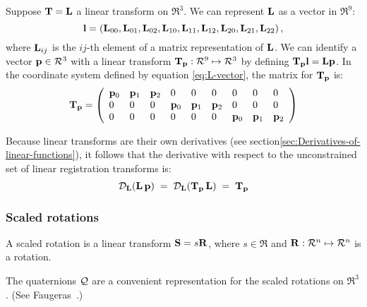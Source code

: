 Suppose ${\mathbf T} = {\mathbf L}$ a linear transform on $\Re^3$.
We can represent ${\mathbf L}$ as a vector in $\Re^9$:
\begin{equation}
\label{eq:L-vector}
{\mathbf l} = \left({\mathbf L}_{00},{\mathbf L}_{01},{\mathbf L}_{02},
       {\mathbf L}_{10},{\mathbf L}_{11},{\mathbf L}_{12},
       {\mathbf L}_{20},{\mathbf L}_{21},{\mathbf L}_{22}\right),
\end{equation}
where ${\mathbf L}_{ij}$ is the $ij$-th element of a
matrix representation of ${\mathbf L}$.
We can identify a vector ${\mathbf p} \in \mathcal{R}^3$
with a linear transform ${\mathbf T}_{{\mathbf p}} : \mathcal{R}^9 \mapsto \mathcal{R}^3$
by defining ${\mathbf T}_{{\mathbf p}}{\mathbf l} = {\mathbf L}{\mathbf p}$.
In the coordinate system defined by equation \ref{eq:L-vector},
the matrix for ${\mathbf T}_{{\mathbf p}}$ is:
\begin{equation}
\label{eq:Tp-matrix}
{\mathbf T}_{{\mathbf p}} =
\left(
\begin{array}{lllllllll}
{\mathbf p}_0 & {\mathbf p}_1 & {\mathbf p}_2 &  0   &  0   &  0   &  0   &  0   &  0 \\
 0   &  0   &  0   & {\mathbf p}_0 & {\mathbf p}_1 & {\mathbf p}_2 &  0   &  0   &  0 \\
 0   &  0   &  0   &  0   &  0   &  0   & {\mathbf p}_0 & {\mathbf p}_1 & {\mathbf p}_2 \\
\end{array}
\right)
\end{equation}

Because linear transforms are their own derivatives
(see section\ref{sec:Derivatives-of-linear-functions}),
it follows that the derivative with respect to the
unconstrained set of linear registration transforms is:
\begin{equation}
\label{eq:linear-transform-derivative}
{\mathcal D}_{{\mathbf L}}{\left( {\mathbf L} \, {\mathbf p} \right)}
 \; = \;
{\mathcal D}_{{\mathbf L}}{\left( {\mathbf T}_{{\mathbf p}} \, {\mathbf L} \right)}
 \; = \;
{\mathbf T}_{{\mathbf p}}
\end{equation}

\subsubsection{Scaled rotations}
\label{sec:Scaled-rotations}

A scaled rotation
is a linear transform ${\mathbf S} = s {\mathbf R}$,
where $s \in \Re$ and ${\mathbf R} : \mathcal{R}^n \mapsto \mathcal{R}^n$
is a rotation.

The quaternions $\mathcal{Q}$ are a convenient representation
for the scaled rotations on $\Re^3$.
(See Faugeras~\cite[sec.~5.5.2]{Faugeras:1993:3dVision}.)

